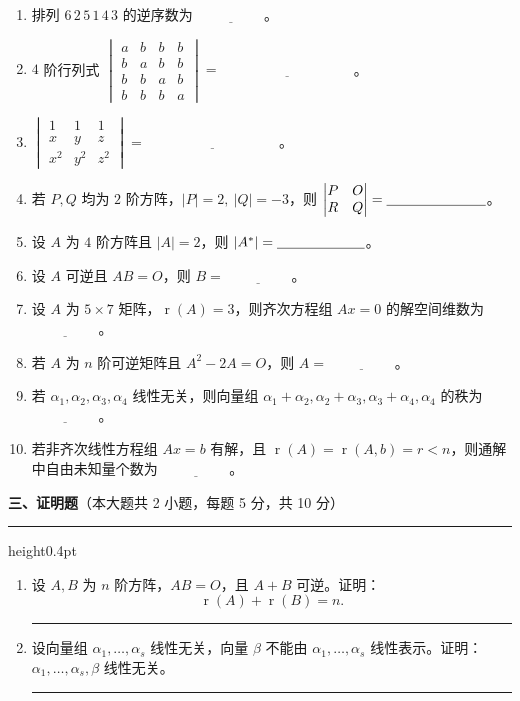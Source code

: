 \documentclass[12pt]{ctexart}
\newcommand{\rnk}{\operatorname{r}}
\newcommand{\blank}[1][2.6cm]{\underline{\hspace{#1}}}
\newcommand{\bigsection}[2]{%
  \vspace{7pt}%
  {\noindent\bfseries\large #1}\hfill{\normalsize（本大题共 #2）}\par
  \vspace{2pt}\hrule height0.4pt\vspace{8pt}}
\newcommand{\workarea}[1]{\par\vspace{0.35em}\noindent\rule{\linewidth}{0.25pt}\par\vspace{#1}}
\begin{document}
\begin{enumerate}[label=\arabic*.]
\item 排列 $6\,2\,5\,1\,4\,3$ 的逆序数为 $\blank[2cm]$。
\item $4$ 阶行列式
  $\begin{vmatrix}
  a&b&b&b\\ b&a&b&b\\ b&b&a&b\\ b&b&b&a
  \end{vmatrix}=\blank[4cm]$。
\item $\begin{vmatrix}1&1&1\\ x&y&z\\ x^{2}&y^{2}&z^{2}\end{vmatrix}=\blank[4cm]$。
\item 若 $P,Q$ 均为 $2$ 阶方阵，$|P|=2,\ |Q|=-3$，则
  $\begin{vmatrix}P&O\\ R&Q\end{vmatrix}=\blank[2.5cm]$。
\item 设 $A$ 为 $4$ 阶方阵且 $|A|=2$，则 $|A^{*}|=\blank[2.2cm]$。
\item 设 $A$ 可逆且 $AB=O$，则 $B=\blank[2cm]$。
\item 设 $A$ 为 $5\times 7$ 矩阵，$\rnk(A)=3$，则齐次方程组 $Ax=0$ 的解空间维数为 $\blank[2cm]$。
\item 若 $A$ 为 $n$ 阶可逆矩阵且 $A^{2}-2A=O$，则 $A=\blank[2cm]$。
\item 若 $\alpha_1,\alpha_2,\alpha_3,\alpha_4$ 线性无关，则向量组
  $\alpha_1+\alpha_2,\alpha_2+\alpha_3,\alpha_3+\alpha_4,\alpha_4$ 的秩为 $\blank[2cm]$。
\item 若非齐次线性方程组 $Ax=b$ 有解，且 $\rnk(A)=\rnk(A,b)=r<n$，则通解中自由未知量个数为 $\blank[2cm]$。
\end{enumerate}

\bigsection{三、证明题}{2 小题，每题 5 分，共 10 分}

\begin{enumerate}[label=\arabic*.]
\item 设 $A,B$ 为 $n$ 阶方阵，$AB=O$，且 $A+B$ 可逆。证明：
  \[
  \rnk(A)+\rnk(B)=n.
  \]
\workarea{4.2cm}

\item 设向量组 $\alpha_1,\dots,\alpha_s$ 线性无关，向量 $\beta$ 不能由 $\alpha_1,\dots,\alpha_s$ 线性表示。证明：
  $\alpha_1,\dots,\alpha_s,\beta$ 线性无关。
\workarea{4.2cm}
\end{enumerate}
\end{document}
